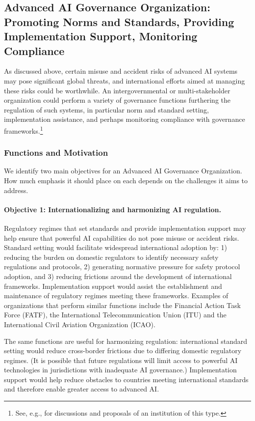 \documentclass[12pt]{article}
\begin{document}
\subsection{Advanced AI Governance Organization: Promoting Norms and
Standards, Providing Implementation Support, Monitoring
Compliance}

As discussed above, certain misuse and accident risks of advanced AI
systems may pose significant global threats, and international efforts
aimed at managing these risks could be worthwhile. An intergovernmental
or multi-stakeholder organization could perform a variety of governance
functions furthering the regulation of such systems, in particular norm
and standard setting, implementation assistance, and perhaps monitoring
compliance with governance frameworks.\footnote{See, e.g.,
  \cite{noauthor_secretary-general_2023, noauthor_elders_2023,
  altman_governance_2023, chowdhury_ai_2023, marcus_world_2023} for discussions and
  proposals of an institution of this type.}


\subsubsection*{Functions and
Motivation}

We identify two main objectives for an Advanced AI Governance
Organization. How much emphasis it should place on each depends on the
challenges it aims to address.

\paragraph{Objective 1: Internationalizing and harmonizing AI regulation.}
Regulatory regimes that set standards and provide implementation support
may help ensure that powerful AI capabilities do not pose misuse or
accident risks. Standard setting would facilitate widespread
international adoption by: 1) reducing the burden on domestic regulators
to identify necessary safety regulations and protocols, 2) generating
normative pressure for safety protocol adoption, and 3) reducing
frictions around the development of international frameworks.
Implementation support would assist the establishment and maintenance of
regulatory regimes meeting these frameworks. Examples of organizations
that perform similar functions include the Financial Action Task Force
(FATF), the International Telecommunication Union (ITU) and the
International Civil Aviation Organization (ICAO).

The same functions are useful for harmonizing regulation: international
standard setting would reduce cross-border frictions due to differing
domestic regulatory regimes. (It is possible that future regulations
will limit access to powerful AI technologies in jurisdictions with
inadequate AI governance.) Implementation support would help reduce
obstacles to countries meeting international standards and therefore
enable greater access to advanced AI.
\end{document}
